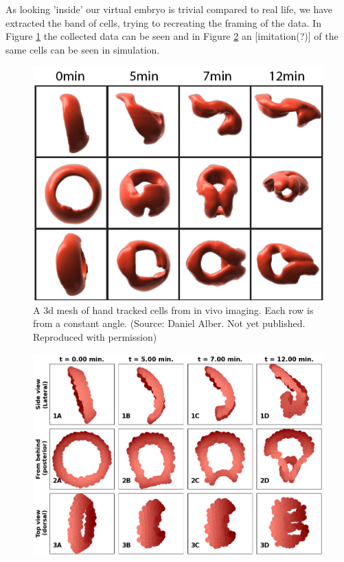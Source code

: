 As looking 'inside' our virtual embryo is trivial compared to real life, we have extracted the band of cells, trying to recreating the framing of the data. In Figure \ref{fig:daniel-cells} the collected data can be seen and in Figure \ref{fig:comparetodaniel} an [imitation(?)] of the same cells can be seen in simulation. 
\newpage
\begin{figure}[H]
    \centering
    \includegraphics[width=0.7 \linewidth]{chapters/Results/figures/DanielCut.png}
    \caption{A 3d mesh of hand tracked cells from in vivo imaging. Each row is from a constant angle. (Source: Daniel Alber. Not yet published. Reproduced with permission)}
    \label{fig:daniel-cells}
\end{figure}
\begin{figure}[H]
    \centering
    \includegraphics[width=0.8\linewidth]{chapters/Results/figures/CompareToDaniel.png}
    \caption{}
    \label{fig:comparetodaniel}
\end{figure}

